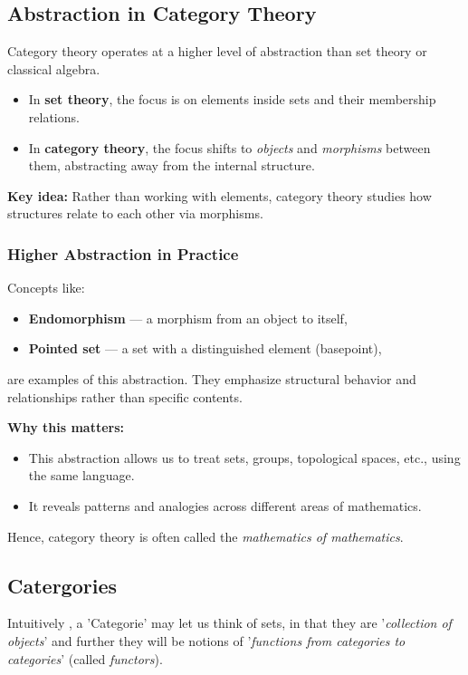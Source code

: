 \documentclass[10pt]{article}
\theoremstyle{plain}
\theoremstyle{definition}
\begin{document}
\subsection*{Abstraction in Category Theory}

Category theory operates at a higher level of abstraction than set theory or classical algebra.

\begin{itemize}
	\item In \textbf{set theory}, the focus is on elements inside sets and their membership relations.
	\item In \textbf{category theory}, the focus shifts to \emph{objects} and \emph{morphisms} between them, abstracting away from the internal structure.
\end{itemize}

\textbf{Key idea:} Rather than working with elements, category theory studies how structures relate to each other via morphisms. 

\subsubsection*{Higher Abstraction in Practice}

Concepts like:
\begin{itemize}
	\item \textbf{Endomorphism} — a morphism from an object to itself,
	\item \textbf{Pointed set} — a set with a distinguished element (basepoint),
\end{itemize}
are examples of this abstraction. They emphasize structural behavior and relationships rather than specific contents.

\textbf{Why this matters:}
\begin{itemize}
	\item This abstraction allows us to treat sets, groups, topological spaces, etc., using the same language.
	\item It reveals patterns and analogies across different areas of mathematics.
\end{itemize}

Hence, category theory is often called the \emph{mathematics of mathematics}.

\subsection*{Catergories}

Intuitively , a 'Categorie' may let us think of sets, in that they are '\textit{collection of objects}' and further they will be notions of '\textit{functions from categories to categories}' (called \textit{functors}).\vspace{0.5cm}
\end{document}
